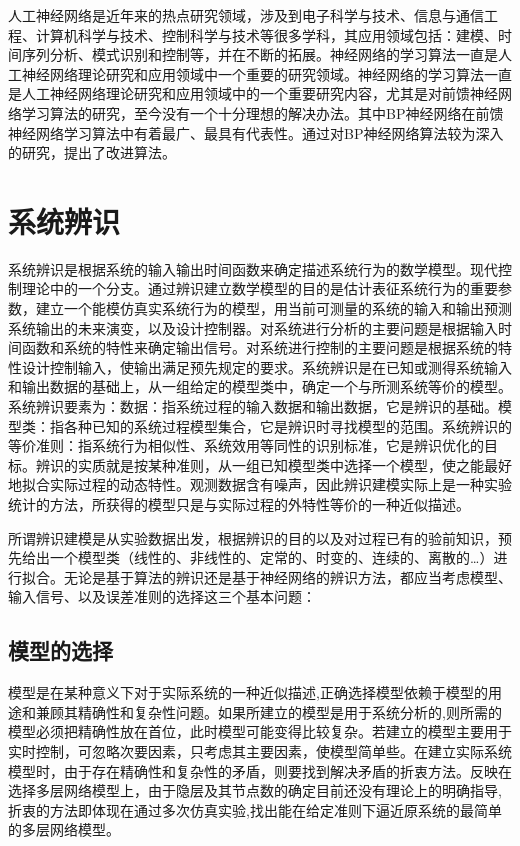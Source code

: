 \documentclass[UTF8]{ctexart}
\begin{document}
人工神经网络是近年来的热点研究领域，涉及到电子科学与技术、信息与通信工程、计算机科学与技术、控制科学与技术等很多学科，其应用领域包括：建模、时间序列分析、模式识别和控制等，并在不断的拓展。神经网络的学习算法一直是人工神经网络理论研究和应用领域中一个重要的研究领域。神经网络的学习算法一直是人工神经网络理论研究和应用领域中的一个重要研究内容，尤其是对前馈神经网络学习算法的研究，至今没有一个十分理想的解决办法。其中BP神经网络在前馈神经网络学习算法中有着最广、最具有代表性。通过对BP神经网络算法较为深入的研究，提出了改进算法。
\section{系统辨识}

系统辨识是根据系统的输入输出时间函数来确定描述系统行为的数学模型。现代控制理论中的一个分支。通过辨识建立数学模型的目的是估计表征系统行为的重要参数，建立一个能模仿真实系统行为的模型，用当前可测量的系统的输入和输出预测系统输出的未来演变，以及设计控制器。对系统进行分析的主要问题是根据输入时间函数和系统的特性来确定输出信号。对系统进行控制的主要问题是根据系统的特性设计控制输入，使输出满足预先规定的要求。系统辨识是在已知或测得系统输入和输出数据的基础上，从一组给定的模型类中，确定一个与所测系统等价的模型。系统辨识要素为：数据：指系统过程的输入数据和输出数据，它是辨识的基础。模型类：指各种已知的系统过程模型集合，它是辨识时寻找模型的范围。系统辨识的等价准则：指系统行为相似性、系统效用等同性的识别标准，它是辨识优化的目标。辨识的实质就是按某种准则，从一组已知模型类中选择一个模型，使之能最好地拟合实际过程的动态特性。观测数据含有噪声，因此辨识建模实际上是一种实验统计的方法，所获得的模型只是与实际过程的外特性等价的一种近似描述。

所谓辨识建模是从实验数据出发，根据辨识的目的以及对过程已有的验前知识，预先给出一个模型类（线性的、非线性的、定常的、时变的、连续的、离散的…）进行拟合。无论是基于算法的辨识还是基于神经网络的辨识方法，都应当考虑模型、输入信号、以及误差准则的选择这三个基本问题：
\subsection{模型的选择}
模型是在某种意义下对于实际系统的一种近似描述,正确选择模型依赖于模型的用途和兼顾其精确性和复杂性问题。如果所建立的模型是用于系统分析的,则所需的模型必须把精确性放在首位，此时模型可能变得比较复杂。若建立的模型主要用于实时控制，可忽略次要因素，只考虑其主要因素，使模型简单些。在建立实际系统模型时，由于存在精确性和复杂性的矛盾，则要找到解决矛盾的折衷方法。反映在选择多层网络模型上，由于隐层及其节点数的确定目前还没有理论上的明确指导,折衷的方法即体现在通过多次仿真实验,找出能在给定准则下逼近原系统的最简单的多层网络模型。
\end{document}
